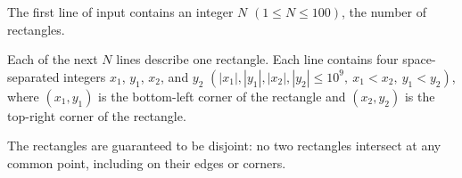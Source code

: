 
The first line of input contains an integer $N$ $(1 \leq N \leq 100)$, the number of rectangles.

Each of the next $N$ lines describe one rectangle.
Each line contains four space-separated integers $x_1$, $y_1$, $x_2$, and $y_2$
$(|x_1|, |y_1|, |x_2|, |y_2| \leq 10^{9},\ x_1 < x_2,\ y_1 < y_2)$, where $(x_1, y_1)$ is the
bottom-left corner of the rectangle and $(x_2, y_2)$ is the top-right corner of the rectangle.

The rectangles are guaranteed to be disjoint: no two rectangles intersect at any common point, including on their edges or corners.

